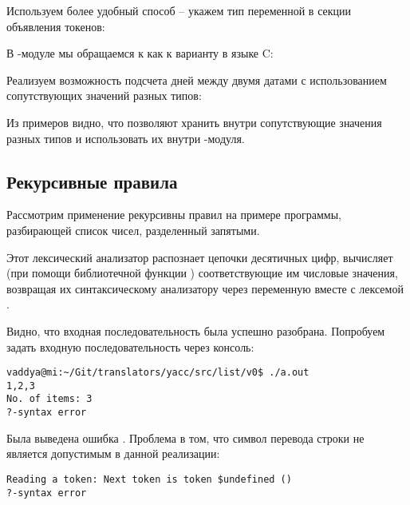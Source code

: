 

Используем более удобный способ -- укажем тип переменной в секции объявления токенов:



В -модуле мы обращаемся к  как к варианту  в языке C:


Реализуем возможность подсчета дней между двумя датами с использованием сопутствующих значений разных типов:



Из примеров видно, что  позволяют хранить внутри сопутствующие значения разных типов и использовать их внутри -модуля.

\subsection{Рекурсивные правила}

Рассмотрим применение рекурсивны правил на примере программы, разбирающей список чисел, разделенный запятыми.



Этот лексический анализатор распознает цепочки десятичных цифр, вычисляет (при помощи библиотечной функции ) соответствующие им числовые значения, возвращая их
синтаксическому анализатору через переменную  вместе с лексемой .


Видно, что входная последовательность была успешно разобрана. Попробуем задать входную последовательность через консоль:

\begin{lstlisting}
vaddya@mi:~/Git/translators/yacc/src/list/v0$ ./a.out 
1,2,3 
No. of items: 3
?-syntax error
\end{lstlisting}

Была выведена ошибка . Проблема в том, что символ перевода строки  не является допустимым в данной реализации:

\begin{lstlisting}
Reading a token: Next token is token $undefined ()
?-syntax error
\end{lstlisting}

